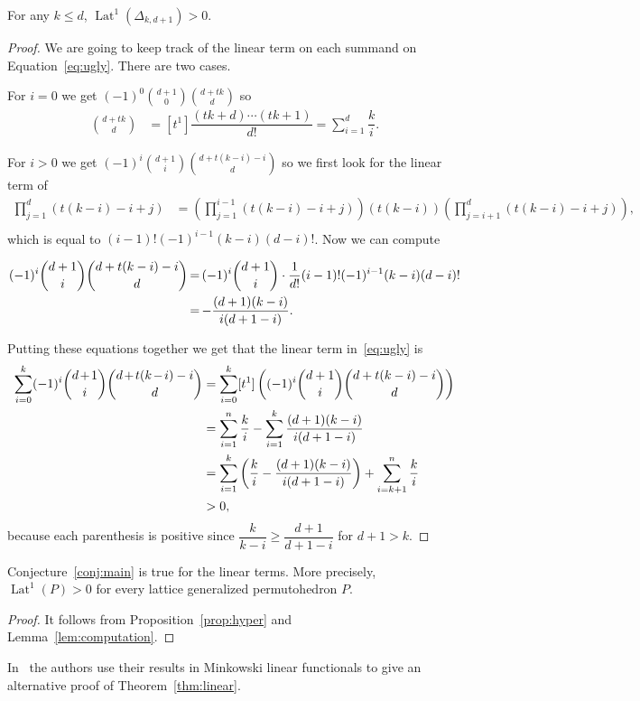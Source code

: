 \documentclass[ALCO,ThmDefs,Unicode,epreuves]{cedram}
\DeclareMathOperator{\Lat}{Lat}
\newcommand*{\Mk}{\mkern -2mu}
\begin{document}
\begin{lemm}\label{lem:computation}
	For any $k\leq d$, $\Lat^1(\Delta_{k,d+1})>0$.
\end{lemm}

\begin{proof}
	We are going to keep track of the linear term on each summand on Equation~\eqref{eq:ugly}. There are two cases.
	
	For $i=0$ we get $(-1)^0\binom{d+1}{0}\binom{d+tk}{d}$ so
	\begin{align*}
	[t^1]\binom{d+tk}{d}&=[t^1]\dfrac{(tk+d)\cdots(tk+1)}{d!} =\sum_{i=1}^d\dfrac{k}{i}.
	\end{align*}
	
	For $i>0$ we get $(-1)^i\binom{d+1}{i}\binom{d+t(k-i)-i}{d}$ so we first look for the linear term of 
	\begin{align*}
	\prod_{j=1}^d(t(k-i)-i+j)&=\left(\prod_{j=1}^{i-1}(t(k-i)-i+j)\right)\left(t(k-i)\right)\left(\prod_{j=i+1}^d(t(k-i)-i+j)\right),\\
	\end{align*}
	which is equal to $(i-1)!(-1)^{i-1}(k-i)(d-i)!$. Now we can compute
	
	\begin{align*}
	[t^1](-1)^i\binom{d+1}{i}\binom{d+t(k-i)-i}{d}&\Mk =\Mk (-1)^i\binom{d+1}{i}\cdot\dfrac{1}{d!} (i-1)!(-1)^{i-1}(k-i)(d-i)!\\
	&\Mk =\Mk -\dfrac{(d+1)(k-i)}{i(d+1-i)}.
	\end{align*}
	
	Putting these equations together we get that the linear term in~\eqref{eq:ugly} is
	\begin{align*}
	[t^1]\sum_{i=0}^k (-1)^i\binom{d\Mk +\Mk 1}{i}\binom{d\Mk +\Mk t(k\Mk -\Mk i)-i}{d}&=\sum_{i=0}^k [t^1]\left((-1)^i\binom{d+1}{i}\binom{d+t(k-i)-i}{d}\right)\\
	&=\sum_{i=1}^n\dfrac{k}{i} - \sum_{i=1}^k\dfrac{(d+1)(k-i)}{i(d+1-i)}\\
	&=\sum_{i=1}^k \left(\dfrac{k}{i}-\dfrac{(d+1)(k-i)}{i(d+1-i)}\right) + \sum_{i=k+1}^n \dfrac{k}{i}\\
	&>0,
	\end{align*}
	because each parenthesis is positive since $\dfrac{k}{k-i}\geq \dfrac{d+1}{d+1-i}$ for $d+1>k$. 
\end{proof}

\begin{thm}\label{thm:linear}
	Conjecture~\ref{conj:main} is true for the linear terms. More precisely, $\Lat^1(P)>0$ for every lattice generalized permutohedron $P$.
\end{thm}
\begin{proof}
	It follows from Proposition~\ref{prop:hyper} and Lemma~\ref{lem:computation}.
\end{proof}
In~\cite{kat} the authors use their results in Minkowski linear functionals to give an alternative proof of Theorem~\ref{thm:linear}. 
\end{document}
